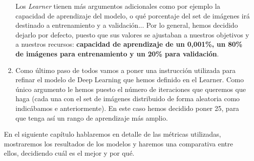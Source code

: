 \begin{enumerate}
Los \textit{Learner} tienen más argumentos adicionales como por ejemplo la capacidad de aprendizaje del modelo, o qué porcentaje del set de imágenes irá destinado a entrenamiento y a validación... Por lo general, hemos decidido dejarlo por defecto, puesto que sus valores se ajustaban a nuestros objetivos y a nuestros recursos: \textbf{capacidad de aprendizaje de un 0,001\%, un 80\% de imágenes para entrenamiento y un 20\% para validación}.
\item Como último paso de todos vamos a poner una instrucción utilizada para refinar el modelo de Deep Learning que hemos definido en el Learner. Como único argumento le hemos puesto el número de iteraciones que queremos que haga (cada una con el set de imágenes distribuido de forma aleatoria como indicábamos e anteriormente). En este caso hemos decidido poner 25, para que tenga así un rango de aprendizaje más amplio.

\end{enumerate}

En el siguiente capítulo hablaremos en detalle de las métricas utilizadas, mostraremos los resultados de los modelos y haremos una comparativa entre ellos, decidiendo cuál es el mejor y por qué.